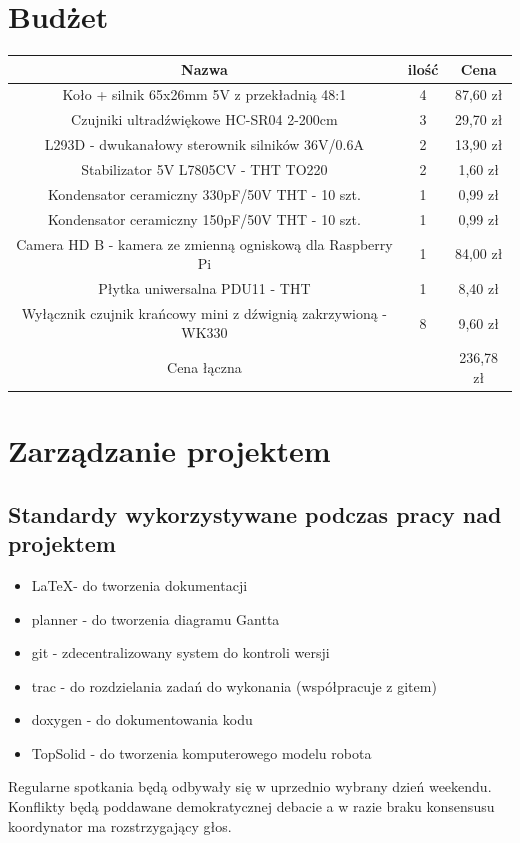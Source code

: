 \documentclass[a4paper]{article}
\begin{document}
\section{Budżet}
   \begin{center}
    \begin{tabular}{|c|c|c|}
        \hline
         Nazwa  & ilość & Cena  \\
        \hline
         Koło + silnik 65x26mm 5V z przekładnią 48:1 & 4 & 87,60 zł \\
        \hline
        Czujniki ultradźwiękowe HC-SR04 2-200cm & 3 & 29,70 zł\\
        \hline
        L293D - dwukanałowy sterownik silników 36V/0.6A & 2 & 13,90 zł\\
        \hline
        Stabilizator 5V L7805CV - THT TO220 & 2 & 1,60 zł\\
        \hline
        Kondensator ceramiczny 330pF/50V THT - 10 szt. & 1 & 0,99 zł\\
        \hline
        Kondensator ceramiczny 150pF/50V THT - 10 szt. & 1 & 0,99 zł\\
        \hline
        Camera HD B - kamera ze zmienną ogniskową dla Raspberry Pi & 1 & 84,00 zł\\
        \hline
        Płytka uniwersalna PDU11 - THT & 1 & 8,40 zł\\
        \hline
        Wyłącznik czujnik krańcowy mini z dźwignią zakrzywioną - WK330 & 8 & 9,60 zł\\
        \hline
        Cena łączna & & 236,78 zł\\
        \hline
    \end{tabular}
    \end{center}
\section{Zarządzanie projektem}
    \subsection{Standardy wykorzystywane podczas pracy nad projektem}
    \begin{itemize}
        \item \LaTeX - do tworzenia dokumentacji
        \item planner - do tworzenia diagramu Gantta
        \item git - zdecentralizowany system do kontroli wersji
        \item trac - do rozdzielania zadań do wykonania (współpracuje z gitem)
        \item doxygen - do dokumentowania kodu
        \item TopSolid - do tworzenia komputerowego modelu robota
    \end{itemize}
    Regularne spotkania będą odbywały się w uprzednio wybrany dzień weekendu. Konflikty będą poddawane demokratycznej debacie a w razie braku konsensusu koordynator ma rozstrzygający głos.
\end{document}
